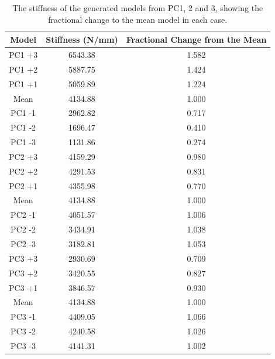 \begin{table}[h]
\centering
\caption{The stiffness of the generated models from PC1, 2 and 3, showing the fractional change to the mean model in each case.}
\label{tab:stiffness_gen_models}
\begin{tabular}{c|c|c}
Model  & Stiffness (N/mm) & Fractional Change from the Mean \\ \hline \hline
PC1 +3 & 6543.38          & 1.582                           \\
PC1 +2 & 5887.75          & 1.424                           \\
PC1 +1 & 5059.89          & 1.224                           \\
Mean   & 4134.88          & 1.000                           \\
PC1 -1 & 2962.82          & 0.717                           \\
PC1 -2 & 1696.47          & 0.410                           \\
PC1 -3 & 1131.86          & 0.274                           \\ \hline
PC2 +3 & 4159.29          & 0.980                           \\
PC2 +2 & 4291.53          & 0.831                           \\
PC2 +1 & 4355.98          & 0.770                           \\
Mean   & 4134.88          & 1.000                           \\
PC2 -1 & 4051.57          & 1.006                           \\
PC2 -2 & 3434.91          & 1.038                           \\
PC2 -3 & 3182.81          & 1.053                           \\ \hline
PC3 +3 & 2930.69          & 0.709                           \\
PC3 +2 & 3420.55          & 0.827                           \\
PC3 +1 & 3846.57          & 0.930                           \\
Mean   & 4134.88          & 1.000                           \\
PC3 -1 & 4409.05          & 1.066                           \\
PC3 -2 & 4240.58          & 1.026                           \\ \hline
PC3 -3 & 4141.31          & 1.002                          
\end{tabular}
\end{table}



